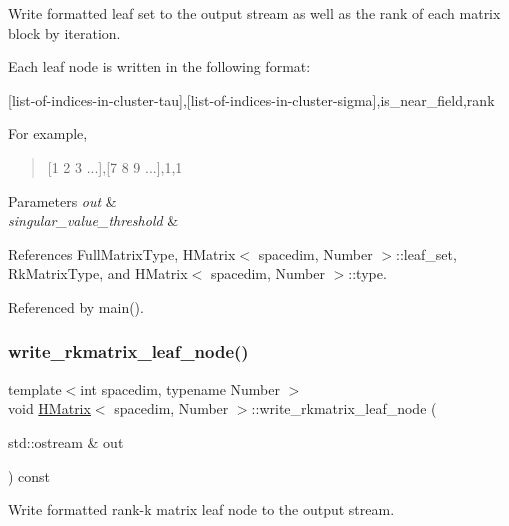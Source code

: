 Write formatted leaf set to the output stream as well as the rank of each matrix block by iteration.

Each leaf node is written in the following format\+:

\begin{quote}


\end{quote}
\mbox{[}list-\/of-\/indices-\/in-\/cluster-\/tau\mbox{]},\mbox{[}list-\/of-\/indices-\/in-\/cluster-\/sigma\mbox{]},is\+\_\+near\+\_\+field,rank

For example,

\begin{quote}
\mbox{[}1 2 3 ...\mbox{]},\mbox{[}7 8 9 ...\mbox{]},1,1 \end{quote}

\begin{DoxyParams}{Parameters}
{\em out} & \\
\hline
{\em singular\+\_\+value\+\_\+threshold} & \\
\hline
\end{DoxyParams}


References Full\+Matrix\+Type, H\+Matrix$<$ spacedim, Number $>$\+::leaf\+\_\+set, Rk\+Matrix\+Type, and H\+Matrix$<$ spacedim, Number $>$\+::type.



Referenced by main().

\mbox{\label{classHMatrix_ac2c8ccd5763d3952505741c657b6468c}} 
\subsubsection{\texorpdfstring{write\+\_\+rkmatrix\+\_\+leaf\+\_\+node()}{write\_rkmatrix\_leaf\_node()}}
{\footnotesize\ttfamily template$<$int spacedim, typename Number $>$ \\
void \hyperlink{classHMatrix}{H\+Matrix}$<$ spacedim, Number $>$\+::write\+\_\+rkmatrix\+\_\+leaf\+\_\+node (\begin{DoxyParamCaption}\item[{std\+::ostream \&}]{out }\end{DoxyParamCaption}) const}

Write formatted rank-\/k matrix leaf node to the output stream.

